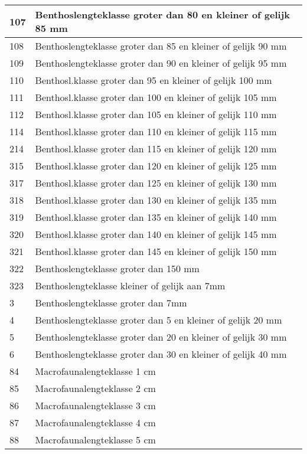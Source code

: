 \documentclass[
]{book}
\begin{document}
\begin{table}
\begin{tabular}[t]{l|l}
\hline
107 & Benthoslengteklasse groter dan 80 en kleiner of gelijk 85 mm\\
\hline
108 & Benthoslengteklasse groter dan 85 en kleiner of gelijk 90 mm\\
\hline
109 & Benthoslengteklasse groter dan 90 en kleiner of gelijk 95 mm\\
\hline
110 & Benthosl.klasse groter dan 95 en kleiner of gelijk 100 mm\\
\hline
111 & Benthosl.klasse groter dan 100 en kleiner of gelijk 105 mm\\
\hline
112 & Benthosl.klasse groter dan 105 en kleiner of gelijk 110 mm\\
\hline
114 & Benthosl.klasse groter dan 110 en kleiner of gelijk 115 mm\\
\hline
214 & Benthosl.klasse groter dan 115 en kleiner of gelijk 120 mm\\
\hline
315 & Benthosl.klasse groter dan 120 en kleiner of gelijk 125 mm\\
\hline
317 & Benthosl.klasse groter dan 125 en kleiner of gelijk 130 mm\\
\hline
318 & Benthosl.klasse groter dan 130 en kleiner of gelijk 135 mm\\
\hline
319 & Benthosl.klasse groter dan 135 en kleiner of gelijk 140 mm\\
\hline
320 & Benthosl.klasse groter dan 140 en kleiner of gelijk 145 mm\\
\hline
321 & Benthosl.klasse groter dan 145 en kleiner of gelijk 150 mm\\
\hline
322 & Benthoslengteklasse groter dan 150 mm\\
\hline
323 & Benthoslengteklasse kleiner of gelijk aan 7mm\\
\hline
3 & Benthoslengteklasse groter dan 7mm\\
\hline
4 & Benthoslengteklasse groter dan 5 en kleiner of gelijk 20 mm\\
\hline
5 & Benthoslengteklasse groter dan 20 en kleiner of gelijk 30 mm\\
\hline
6 & Benthoslengteklasse groter dan 30 en kleiner of gelijk 40 mm\\
\hline
84 & Macrofaunalengteklasse 1 cm\\
\hline
85 & Macrofaunalengteklasse 2 cm\\
\hline
86 & Macrofaunalengteklasse 3 cm\\
\hline
87 & Macrofaunalengteklasse 4 cm\\
\hline
88 & Macrofaunalengteklasse 5 cm\\

\end{tabular}
\end{table}
\end{document}

